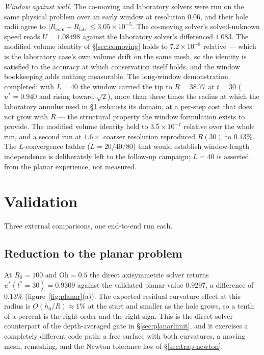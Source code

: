 \documentclass[11pt,a4paper]{article}
\newcommand{\Oh}{\mathrm{Oh}}
\begin{document}
\emph{Window against wall.} The co-moving and laboratory solvers were run on the
same physical problem over an early window at resolution $0.06$, and their hole
radii agree to $|R_{\mathrm{com}}-R_{\mathrm{lab}}| \le 3.05\times10^{-5}$. The
co-moving solver's solved-unknown speed reads $U = 1.08498$ against the
laboratory solver's differenced $1.083$. The modified volume identity of
\S\ref{sec:comoving} holds to $7.2\times10^{-8}$ relative --- which is the
laboratory case's own volume drift on the same mesh, so the identity is
satisfied to the accuracy at which conservation itself holds, and the window
bookkeeping adds nothing measurable.
The long-window demonstration completed: with $L = 40$ the window carried the
tip to $R = 38.77$ at $t = 30$ ($u^{*} = 0.940$ and rising toward $\sqrt{2}$),
more than three times the radius at which the laboratory annulus used in
\S\ref{sec:validation} exhausts its domain, at a per-step cost that does not
grow with $R$ --- the structural property the window formulation exists to
provide. The modified volume identity held to $3.5\times10^{-7}$ relative over
the whole run, and a second run at $1.6\times$ coarser resolution reproduced
$R(30)$ to $0.13\%$. The $L$-convergence ladder ($L = 20/40/80$) that would
establish window-length independence is deliberately left to the follow-up
campaign; $L = 40$ is asserted from the planar experience, not measured.

\section{Validation}
\label{sec:validation}

Three external comparisons, one end-to-end run each.

\subsection{Reduction to the planar problem}

At $R_{0}=100$ and $\Oh=0.5$ the direct axisymmetric solver returns
$u^{*}(t^{*}=30) = 0.9309$ against the validated planar value $0.9297$, a
difference of $0.13\%$ (figure~\ref{fig:planar}(a)). The expected residual
curvature effect at this radius is $O(h_{0}/R)\approx 1\%$ at the start and
smaller as the hole grows, so a tenth of a percent is the right order and the
right sign. This is the direct-solver counterpart of the depth-averaged gate in
\S\ref{sec:planarlimit}, and it exercises a completely different code path: a
free surface with both curvatures, a moving mesh, remeshing, and the Newton
tolerance law of \S\ref{sec:trap-newton}.
\end{document}
